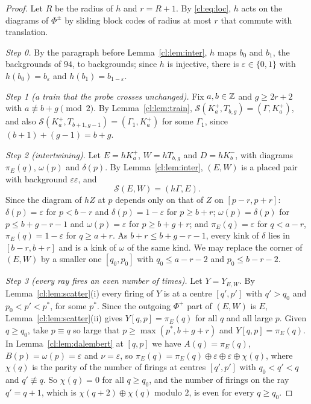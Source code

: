 \begin{proof}
Let $R$ be the radius of $h$ and $r=R+1$. By \eqref{cl:eq:loc}, $h$ acts on the diagrams of $\Phi^\pm$ by sliding block codes of radius at most $r$ that commute with translation.

\emph{Step 0.} By the paragraph before Lemma~\ref{cl:lem:inter}, $h$ maps $b_0$ and $b_1$, the backgrounds of $94$, to backgrounds; since $h$ is injective, there is $\varepsilon\in\{0,1\}$ with $h(b_0)=b_\varepsilon$ and $h(b_1)=b_{1-\varepsilon}$.

\emph{Step 1 (a train that the probe crosses unchanged).} Fix $a,b\in\mathbb{Z}$ and $g\ge2r+2$ with $a\not\equiv b+g\pmod2$. By Lemma~\ref{cl:lem:train}, $\mathcal S(K^+_a,T_{b,g})=(\Gamma,K^+_a)$, and also $\mathcal S(K^+_a,T_{b+1,g-1})=(\Gamma_1,K^+_a)$ for some $\Gamma_1$, since $(b+1)+(g-1)=b+g$.

\emph{Step 2 (intertwining).} Let $E=hK^+_a$, $W=hT_{b,g}$ and $D=hK^-_b$, with diagrams $\pi_E(q)$, $\omega(p)$ and $\delta(p)$. By Lemma~\ref{cl:lem:inter}, $(E,W)$ is a placed pair with background $\varepsilon\varepsilon$, and
\[
\mathcal S(E,W)=(h\Gamma,E).
\]
Since the diagram of $hZ$ at $p$ depends only on that of $Z$ on $[p-r,p+r]$: $\delta(p)=\varepsilon$ for $p<b-r$ and $\delta(p)=1-\varepsilon$ for $p\ge b+r$; $\omega(p)=\delta(p)$ for $p\le b+g-r-1$ and $\omega(p)=\varepsilon$ for $p\ge b+g+r$; and $\pi_E(q)=\varepsilon$ for $q<a-r$, $\pi_E(q)=1-\varepsilon$ for $q\ge a+r$. As $b+r\le b+g-r-1$, every kink of $\delta$ lies in $[b-r,b+r]$ and is a kink of $\omega$ of the same kind. We may replace the corner of $(E,W)$ by a smaller one $[q_0,p_0]$ with $q_0\le a-r-2$ and $p_0\le b-r-2$.

\emph{Step 3 (every ray fires an even number of times).} Let $Y=Y_{E,W}$. By Lemma~\ref{cl:lem:scatter}(i) every firing of $Y$ is at a centre $[q',p']$ with $q'>q_0$ and $p_0<p'<p^*$, for some $p^*$. Since the outgoing $\Phi^+$ part of $(E,W)$ is $E$, Lemma~\ref{cl:lem:scatter}(ii) gives $Y[q,p]=\pi_E(q)$ for all $q$ and all large $p$. Given $q\ge q_0$, take $p\equiv q$ so large that $p\ge\max(p^*,b+g+r)$ and $Y[q,p]=\pi_E(q)$. In Lemma~\ref{cl:lem:dalembert} at $[q,p]$ we have $A(q)=\pi_E(q)$, $B(p)=\omega(p)=\varepsilon$ and $\nu=\varepsilon$, so $\pi_E(q)=\pi_E(q)\oplus\varepsilon\oplus\varepsilon\oplus\chi(q)$, where $\chi(q)$ is the parity of the number of firings at centres $[q',p']$ with $q_0<q'<q$ and $q'\not\equiv q$. So $\chi(q)=0$ for all $q\ge q_0$, and the number of firings on the ray $q'=q+1$, which is $\chi(q+2)\oplus\chi(q)$ modulo $2$, is even for every $q\ge q_0$.


\end{proof}
